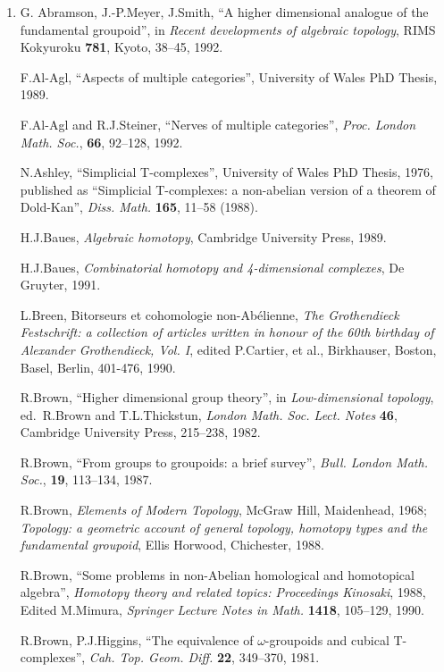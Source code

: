 \documentclass{article}
\begin{document}
\begin{enumerate}
\def\labelenumi{\arabic{enumi})}
\setcounter{enumi}{2}
\item
  G. Abramson, J.-P.Meyer, J.Smith, ``A higher dimensional analogue of
  the fundamental groupoid'', in \emph{Recent developments of algebraic
  topology}, RIMS Kokyuroku \textbf{781}, Kyoto, 38--45, 1992.

  F.Al-Agl, ``Aspects of multiple categories'', University of Wales PhD
  Thesis, 1989.

  F.Al-Agl and R.J.Steiner, ``Nerves of multiple categories'',
  \emph{Proc. London Math. Soc.}, \textbf{66}, 92--128, 1992.

  N.Ashley, ``Simplicial T-complexes'', University of Wales PhD Thesis,
  1976, published as ``Simplicial T-complexes: a non-abelian version of
  a theorem of Dold-Kan'', \emph{Diss. Math.} \textbf{165}, 11--58
  (1988).

  H.J.Baues, \emph{Algebraic homotopy}, Cambridge University Press,
  1989.

  H.J.Baues, \emph{Combinatorial homotopy and 4-dimensional complexes},
  De Gruyter, 1991.

  L.Breen, Bitorseurs et cohomologie non-Abélienne, \emph{The
  Grothendieck Festschrift: a collection of articles written in honour
  of the 60th birthday of Alexander Grothendieck, Vol. I}, edited
  P.Cartier, et al., Birkhauser, Boston, Basel, Berlin, 401-476, 1990.

  R.Brown, ``Higher dimensional group theory'', in \emph{Low-dimensional
  topology}, ed.~R.Brown and T.L.Thickstun, \emph{London Math. Soc.
  Lect. Notes} \textbf{46}, Cambridge University Press, 215--238, 1982.

  R.Brown, ``From groups to groupoids: a brief survey'', \emph{Bull.
  London Math. Soc.}, \textbf{19}, 113--134, 1987.

  R.Brown, \emph{Elements of Modern Topology}, McGraw Hill, Maidenhead,
  1968; \emph{Topology: a geometric account of general topology,
  homotopy types and the fundamental groupoid}, Ellis Horwood,
  Chichester, 1988.

  R.Brown, ``Some problems in non-Abelian homological and homotopical
  algebra'', \emph{Homotopy theory and related topics: Proceedings
  Kinosaki}, 1988, Edited M.Mimura, \emph{Springer Lecture Notes in
  Math.} \textbf{1418}, 105--129, 1990.

  R.Brown, P.J.Higgins, ``The equivalence of \(\omega\)-groupoids and
  cubical T-complexes'', \emph{Cah. Top. Geom. Diff.} \textbf{22},
  349--370, 1981.


\end{enumerate}
\end{document}
